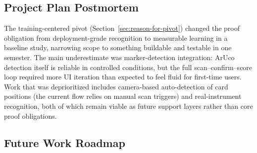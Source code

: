 \documentclass[10pt,a4paper]{article}
\begin{document}
\subsection{Project Plan Postmortem}

The training-centered pivot (Section~\ref{sec:reason-for-pivot}) changed the proof obligation from deployment-grade recognition to measurable learning in a baseline study, narrowing scope to something buildable and testable in one semester. The main underestimate was marker-detection integration: ArUco detection itself is reliable in controlled conditions, but the full scan--confirm--score loop required more UI iteration than expected to feel fluid for first-time users. Work that was deprioritized includes camera-based auto-detection of card positions (the current flow relies on manual scan triggers) and real-instrument recognition, both of which remain viable as future support layers rather than core proof obligations.

\subsection{Future Work Roadmap}
\end{document}
